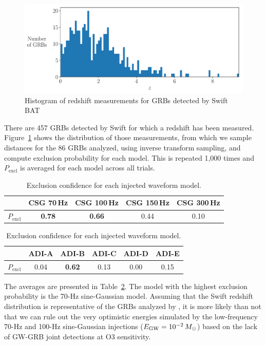 \begin{figure}[h]
  \centering
  \includegraphics[width=\textwidth]{figures/grb/redshifts.pdf}
  \caption{Histogram of redshift measurements for GRBs detected by Swift BAT}
  \label{fig:grb-o3b-redshifts}
\end{figure}

There are 457 GRBs detected by Swift for which a redshift has been measured.
Figure~\ref{fig:grb-o3b-redshifts} shows the distribution of those measurements, from which we sample distances for the 86 GRBs analyzed, using inverse transform sampling, and compute exclusion probability for each model.
This is repeated 1,000 times and $P_{\text{excl}}$ is averaged for each model across all trials.

\begin{table}[h]
  \hspace{0.5cm}
  \caption
  {\label{tab:grb-o3b-model-exclusion} Exclusion confidence for each injected waveform model.}
  \begin{tabular}{c c c c c}
    \hline
    \hline
    \rule{0pt}{4ex}
    & CSG 70\,Hz & CSG 100\,Hz & CSG 150\,Hz & CSG 300\,Hz \\
    \hline
    \rule[-2ex]{0pt}{4ex}
		$P_{\text{excl}}$ & \textbf{0.78} & \textbf{0.66} & 0.44 & 0.10
  \end{tabular}
  \begin{tabular}{c c c c c c}
    \hline
    \hline
    \rule{0pt}{4ex}
    & ADI-A & ADI-B & ADI-C & ADI-D & ADI-E \\
    \hline
    \rule[-2ex]{0pt}{4ex}
    $P_{\text{excl}}$ & 0.04 & \textbf{0.62} & 0.13 & 0.00 & 0.15 \\
    \hline
  \end{tabular}
\end{table}

The averages are presented in Table~\ref{tab:grb-o3b-model-exclusion}.
The model with the highest exclusion probability is the 70-Hz sine-Gaussian model.
Assuming that the Swift redshift distribution is representative of the GRBs analyzed by \xpip, it is more likely than not that we can rule out the very optimistic energies simulated by the low-frequency 70-Hz and 100-Hz sine-Gaussian injections ($E_{\text{GW}} = 10^{-2}\,M_{\odot}$) based on the lack of GW-GRB joint detections at O3 sensitivity.

